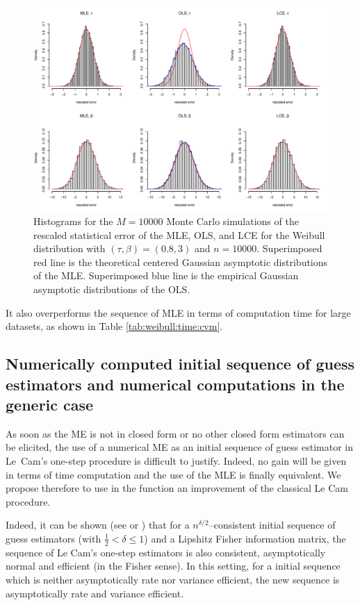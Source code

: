 \begin{figure}[ht]
\centering
\includegraphics[width=\textwidth]{fig-Weibull.pdf}
\caption{Histograms for the $M=10000$ Monte Carlo simulations of the rescaled statistical error of the MLE, OLS, and LCE for the Weibull distribution with $(\tau,\beta)=(0.8,3)$ and $n=10000$. Superimposed red line is the theoretical centered Gaussian asymptotic distributions of the MLE. Superimposed blue line is the empirical Gaussian asymptotic distributions of the OLS.}\label{fig:weibull}
\end{figure}

It also overperforms the sequence of MLE in terms of computation time for large datasets, as shown in Table \ref{tab:weibull:time:cvm}. 




\subsection{Numerically computed initial sequence of guess estimators and numerical computations in the generic case}\label{sec:improved}

As soon as the ME is not in closed form or no other closed form estimators can be elicited, the use of a numerical ME as an initial sequence of guess estimator in Le~Cam's one-step procedure is difficult to justify. Indeed, no gain will be given in terms of time computation and the use of the MLE is finally equivalent. We propose  therefore to use in the  function  an improvement of the classical Le Cam procedure.

Indeed, it can be shown (see \cite{KU15} or \cite{KutMotrun}) that for a $n^{\delta/2}$--consistent initial sequence of guess estimators (with $\frac12 < \delta \leq 1$) and a Lipshitz Fisher information matrix, the sequence of Le Cam's one-step estimators
is also consistent, asymptotically normal and efficient (in the Fisher sense). In this setting, for a initial sequence which is neither asymptotically rate nor variance efficient, the new sequence is asymptotically rate and variance  efficient.

